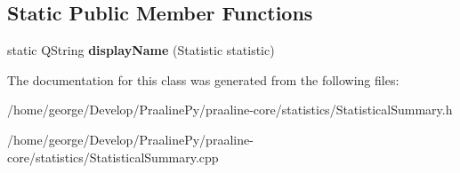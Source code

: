 \subsection*{Static Public Member Functions}
\begin{DoxyCompactItemize}
\item 
\mbox{\label{class_statistical_summary_aab859ef9a90bbea7f1a0c2936136ee37}} 
static Q\+String {\bfseries display\+Name} (Statistic statistic)
\end{DoxyCompactItemize}


The documentation for this class was generated from the following files\+:\begin{DoxyCompactItemize}
\item 
/home/george/\+Develop/\+Praaline\+Py/praaline-\/core/statistics/Statistical\+Summary.\+h\item 
/home/george/\+Develop/\+Praaline\+Py/praaline-\/core/statistics/Statistical\+Summary.\+cpp\end{DoxyCompactItemize}
